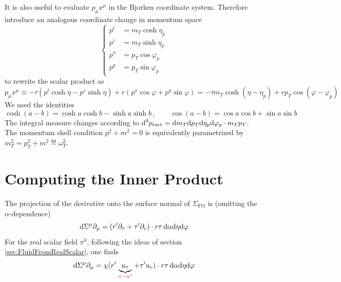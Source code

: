 It is also useful to evaluate $p_\mu x^\mu$ in the Bjorken coordinate system. Therefore introduce an analogous coordinate change in momentum space
\begin{equation}
    \left\{\begin{split}
        p^t&=m_T\cosh\eta_p\\
        p^z&=m_T\sinh\eta_p\\
        p^x&=p_T\cos\varphi_p\\
        p^y&=p_T\sin\varphi_p
    \end{split}\right.
\end{equation}
to rewrite the scalar product as
\begin{equation}
    p_\mu x^\mu\equiv-\tau(p^t\cosh\eta-p^z\sinh\eta)+r(p^x\cos\varphi+p^y\sin\varphi)=-\tau m_T\cosh(\eta-\eta_p)+r p_T\cos(\varphi-\varphi_p)
\end{equation}
We used the identities
\begin{equation}
    \cosh(a-b)=\cosh a\cosh b-\sinh a\sinh b\,,\qquad\cos(a-b)=\cos a\cos b+\sin a\sin b
\end{equation}
The integral measure changes according to $\text{d}^4p_{\text{cart}}=\text{d} m_T\text{d} p_T\text{d}\eta_p\text{d}\varphi_p\cdot m_T p_T$. The momentum shell condition $p^2+m^2=0$ is equivalently parametrized by $m_T^2=p_T^2+m^2\eqdef \omega_T^2$.

\section{Computing the Inner Product}

The projection of the derivative onto the surface normal of $\Sigma_{\text{FO}}$  is (omitting the $\alpha$-dependence) 
\begin{equation}
    \text{d}\Sigma^\mu\partial_\mu=(r^\prime\partial_\tau+\tau^\prime\partial_r)\cdot r\tau\,\text{d}\alpha\text{d}\eta\text{d}\varphi
\end{equation}
For the real scalar field $\pi^0$, following the ideas of section \ref{sec:FluidFromRealScalar}, one finds
\begin{equation}
    \text{d}\Sigma^\mu\partial_\mu=\chi(r^\prime \underbrace{u_\tau}_{\textcolor{red}{=-u^\tau}}+\tau^\prime u_r)\cdot r\tau\,\text{d}\alpha\text{d}\eta\text{d}\varphi
\end{equation}

